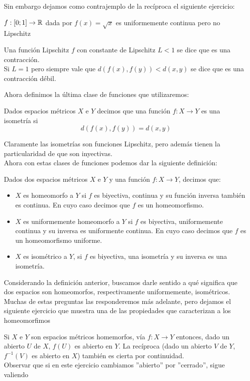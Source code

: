 \documentclass[12pt,a4paper]{book}
\begin{document}
Sin embargo dejamos como contrajemplo de la recíproca el siguiente ejercicio:
\begin{ej}
$f:[0;1] \rightarrow \mathbb{R}$ dada por $f(x)=\sqrt{x}$ es uniformemente continua pero no Lipschitz
\end{ej}
\begin{defi} Una función Lipschitz $f$ con constante de Lipschitz $L <1$ se dice que es una contracción.\\
Si $L=1$ pero siempre vale que $d(f(x),f(y)) < d(x,y)$ se dice que es una contracción débil.
\end{defi}
Ahora definimos la última clase de funciones que utilizaremos:
\begin{defi}
Dados espacios métricos $X$ e $Y$ decimos que una función $f:X \rightarrow Y$ es una isometría si 
$$ d(f(x),f(y)) = d(x,y)$$
\end{defi}
Claramente las isometrías son funciones Lipschitz, pero además tienen la particularidad de que son inyectivas.\\
Ahora con estas clases de funciones podemos dar la siguiente definición:
\begin{defi}
Dados dos espacios métricos $X$ e $Y$ y una función $f:X \rightarrow Y$, decimos que:
\begin{itemize}
\item $X$ es homeomorfo a $Y$ si $f$ es biyectiva, continua y su función inversa también es continua. En cuyo caso decimos que $f$ es un homeomorfismo.
\item $X$ es uniformemente homeomorfo a $Y$ si $f$ es biyectiva, uniformemente continua y su inversa es uniformente continua. En cuyo caso decimos que $f$ es un homeomorfismo uniforme.
\item $X$ es isométrico a $Y$, si $f$ es biyectiva, una isometría y su inversa es una isometría.
\end{itemize}
\end{defi}
Considerando la definición anterior, buscamos darle sentido a qué significa que dos espacios son homeomorfos, respectivamente uniformemente, isométricos. Muchas de estas preguntas las responderemos más adelante, pero dejamos el siguiente ejercicio que muestra una de las propiedades que caracterizan a  los homeomorfimos
\begin{ej} Si $X$ e $Y$ son espacios métricos homemorfos, vía $f:X \rightarrow Y$ entonces, dado un abierto $U$ de $X$, $f(U)$ es abierto en $Y$. La recíproca (dado un abierto $V$ de $Y$, $f^{-1}(V)$ es abierto en $X$) también es cierta por continuidad.\\
Observar que si en este ejercicio cambiamos ''abierto'' por ''cerrado'', sigue valiendo
\end{ej}
\end{document}
